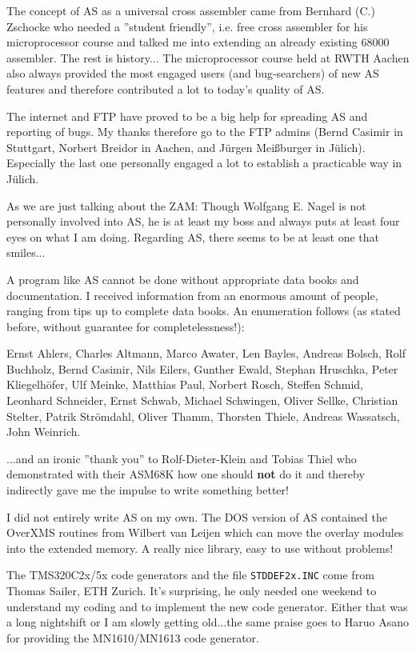 \documentclass[12pt,twoside]{report}
\newcommand{\bb}[1]{{\bf #1}}
\newcommand{\tty}[1]{{\tt #1}}
\begin{document}
The concept of AS as a universal cross assembler came from Bernhard
(C.) Zschocke who needed a ''student friendly'', i.e. free cross
assembler for his microprocessor course and talked me into extending
an already existing 68000 assembler.  The rest is history...
The microprocessor course held at RWTH Aachen also always provided the
most engaged users (and bug-searchers) of new AS features and
therefore contributed a lot to today's quality of AS.

The internet and FTP have proved to be a big help for spreading AS and
reporting of bugs.  My thanks therefore go to the FTP admins (Bernd
Casimir in Stuttgart, Norbert Breidor in Aachen, and J\"urgen Mei\ss\-burger
in J\"ulich).  Especially the last one personally engaged a lot to
establish a practicable way in J\"ulich.

As we are just talking about the ZAM: Though Wolfgang E. Nagel is not
personally involved into AS, he is at least my boss and always puts
at least four eyes on what I am doing.  Regarding AS, there seems to
be at least one that smiles...

A program like AS cannot be done without appropriate data books and
documentation.  I received information from an enormous amount of
people, ranging from tips up to complete data books.  An enumeration
follows (as stated before, without guarantee for completelessness!):

Ernst Ahlers, Charles Altmann, Marco Awater, Len Bayles, Andreas Bolsch, Rolf Buchholz,
Bernd Casimir, Nils Eilers, Gunther Ewald, Stephan Hruschka, Peter Kliegelh\"ofer, Ulf
Meinke, Matthias Paul, Norbert Rosch, Steffen Schmid, Leonhard Schneider,
Ernst Schwab, Michael Schwingen, Oliver Sellke, Christian Stelter,
Patrik Str\"omdahl, Oliver Thamm, Thorsten Thiele, Andreas Wassatsch,
John Weinrich.

...and an ironic ''thank you'' to Rolf-Dieter-Klein and Tobias Thiel who
demonstrated with their ASM68K how one should \bb{not} do it and thereby
indirectly gave me the impulse to write something better!

I did not entirely write AS on my own. The DOS version of AS contained
the OverXMS routines from Wilbert van Leijen which can move the overlay
modules into the extended memory.  A really nice library, easy to use
without problems!

The TMS320C2x/5x code generators and the file \tty{STDDEF2x.INC} come
from Thomas Sailer, ETH Zurich.  It's surprising, he only needed one
weekend to understand my coding and to implement the new code generator.
Either that was a long nightshift or I am slowly getting old...the same
praise goes to Haruo Asano for providing the MN1610/MN1613 code generator.
\end{document}
